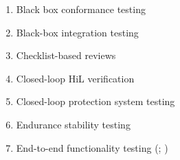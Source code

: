 \begin{enumerate}
    \item Black box conformance testing \citep[p.~25]{JardEtAl1999}
    \item Black-box integration testing \citep[pp.~345\==346]{SakamotoEtAl2013}
    \item Checklist-based reviews \citepISTQB{}
    \item Closed-loop HiL verification \citep[p.~6]{PreußeEtAl2012}
    \item Closed-loop protection system testing \citep[p.~331]{ForsythEtAl2004}
    \item Endurance stability testing \citep[p.~55]{Firesmith2015}
    \item End-to-end functionality testing (\citealp[p.~20]{IEEE2021}; \citealp[Tab.~2]{Gerrard2000a})

\end{enumerate}
